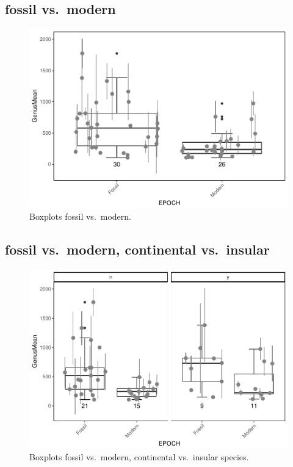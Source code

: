 \documentclass[]{article}
\begin{document}
\newpage

\subsection{fossil vs.~modern}\label{fossil-vs.modern}

\begin{figure}[htbp]
\centering
\includegraphics{MA_JJ_files/figure-latex/Boxplots modern vs. fossil-1.pdf}
\caption{Boxplots fossil vs.~modern.}
\end{figure}

\newpage

\subsection{fossil vs.~modern, continental
vs.~insular}\label{fossil-vs.modern-continental-vs.insular}

\begin{figure}[htbp]
\centering
\includegraphics{MA_JJ_files/figure-latex/Boxplots fossil vs. modern, continental vs. insular-1.pdf}
\caption{Boxplots fossil vs.~modern, continental vs.~insular species.}
\end{figure}
\end{document}
